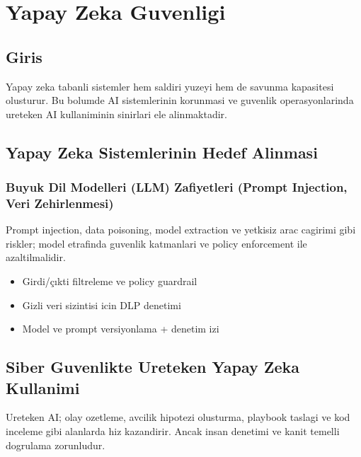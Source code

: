 ﻿\chapter{Yapay Zeka Guvenligi}

\section*{Giris}
Yapay zeka tabanli sistemler hem saldiri yuzeyi hem de savunma kapasitesi olusturur. Bu bolumde AI sistemlerinin korunmasi ve guvenlik operasyonlarinda ureteken AI kullaniminin sinirlari ele alinmaktadir.

\section{Yapay Zeka Sistemlerinin Hedef Alinmasi}
\subsection{Buyuk Dil Modelleri (LLM) Zafiyetleri (Prompt Injection, Veri Zehirlenmesi)}
Prompt injection, data poisoning, model extraction ve yetkisiz arac cagirimi gibi riskler; model etrafinda guvenlik katmanlari ve policy enforcement ile azaltilmalidir.
\begin{itemize}
    \item Girdi/çıkti filtreleme ve policy guardrail
    \item Gizli veri sizintisi icin DLP denetimi
    \item Model ve prompt versiyonlama + denetim izi
\end{itemize}

\section{Siber Guvenlikte Ureteken Yapay Zeka Kullanimi}
Ureteken AI; olay ozetleme, avcilik hipotezi olusturma, playbook taslagi ve kod inceleme gibi alanlarda hiz kazandirir. Ancak insan denetimi ve kanit temelli dogrulama zorunludur.

